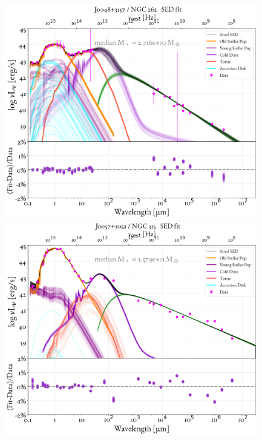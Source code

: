 \begin{figure}
    \centering
    \includegraphics[width=0.85\linewidth]{figures/ResultFits/2_SEDfit_103.png}\\
    \includegraphics[width=0.85\linewidth]{figures/ResultFits/3_SEDfit_128.png}   
\end{figure}

